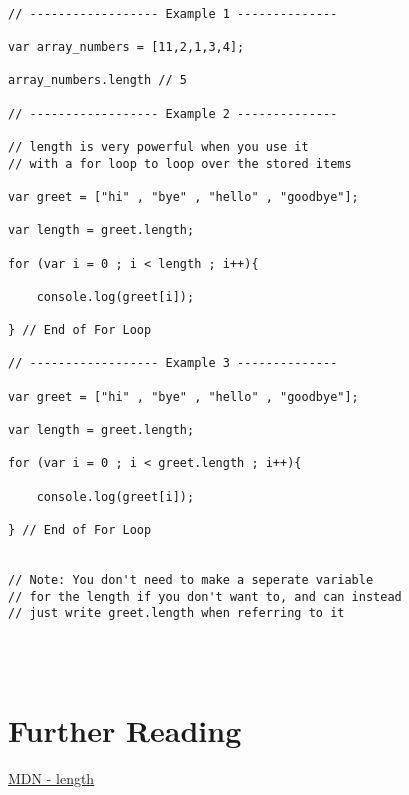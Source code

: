 \documentclass[12pt, letterpaper]{article}
\begin{document}
\begin{lstlisting}

// ------------------ Example 1 --------------

var array_numbers = [11,2,1,3,4];

array_numbers.length // 5		

// ------------------ Example 2 --------------

// length is very powerful when you use it
// with a for loop to loop over the stored items

var greet = ["hi" , "bye" , "hello" , "goodbye"];

var length = greet.length;

for (var i = 0 ; i < length ; i++){

	console.log(greet[i]);

} // End of For Loop

// ------------------ Example 3 --------------

var greet = ["hi" , "bye" , "hello" , "goodbye"];

var length = greet.length;

for (var i = 0 ; i < greet.length ; i++){

	console.log(greet[i]);

} // End of For Loop


// Note: You don't need to make a seperate variable
// for the length if you don't want to, and can instead
// just write greet.length when referring to it


		
\end{lstlisting}

\section*{Further Reading}

\href{https://developer.mozilla.org/en-US/docs/Web/JavaScript/Reference/Global_Objects/Array/length}{MDN - length}
\end{document}
